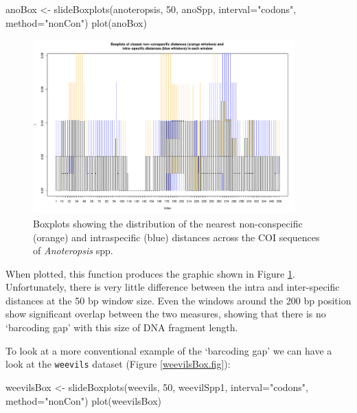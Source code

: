 \documentclass{article}
\newcommand{\fun}[1]{\texttt{#1}}
\begin{document}
\begin{console}
anoBox <- slideBoxplots(anoteropsis, 50, anoSpp, interval="codons", 
method="nonCon")
plot(anoBox)
\end{console}

\begin{figure}[p]
	\centering
	\includegraphics[width=0.9\textwidth]{slideBoxplots}
	\caption{Boxplots showing the distribution of the nearest non-conspecific (orange) and intraspecific (blue) distances across the COI sequences of \emph{Anoteropsis} spp.}
	\label{slideBoxplots.fig}
\end{figure}


When plotted, this function produces the graphic shown in Figure \ref{slideBoxplots.fig}. Unfortunately, there is very little difference between the intra and inter-specific distances at the 50 bp window size. Even the windows around the 200 bp position show significant overlap between the two measures, showing that there is no `barcoding gap' with this size of DNA fragment length.

To look at a more conventional example of the `barcoding gap' we can have a look at the \fun{weevils} dataset (Figure \ref{weevilsBox.fig}):

\begin{console}
weevilsBox <- slideBoxplots(weevils, 50, weevilSpp1, interval="codons", 
method="nonCon")
plot(weevilsBox)
\end{console}
\end{document}
